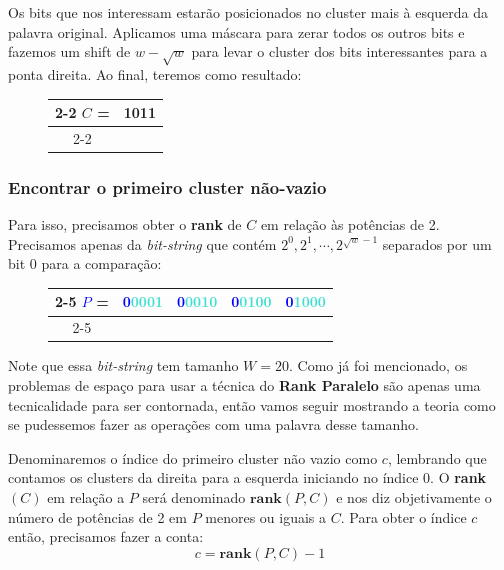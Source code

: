 Os bits que nos interessam estarão posicionados no cluster mais à esquerda da
palavra original. Aplicamos uma máscara para zerar todos os outros bits e
fazemos um shift de $w-\sqrt{w}$ para levar o cluster dos bits interessantes
para a ponta direita. Ao final, teremos como resultado:

\begin{figure}[h]
 \bf \Large\centering
 \begin{tabular}{c|c|}
\cline{2-2}
\textcolor{PineGreen}{$C$} = &
\textcolor{PineGreen}{1011} \\
\cline{2-2}
  \end{tabular}
\end{figure}

\subsubsection{Encontrar o primeiro cluster não-vazio}

Para isso, precisamos obter o \textbf{rank} de $C$ em relação às potências de 2.
Precisamos apenas da \textit{bit-string} que contém
${2^0,2^1,\cdots,2^{\sqrt{w}-1}}$ separados por um bit 0 para a comparação:

\begin{figure}[h]
 \bf \Large\centering
 \begin{tabular}{c|cccc|}
\cline{2-5}
\textcolor{Blue}{$P$} = &
\textcolor{Blue}{0}\textcolor{Turquoise}{0001} &
\textcolor{Blue}{0}\textcolor{Turquoise}{0010} &
\textcolor{Blue}{0}\textcolor{Turquoise}{0100} &
\textcolor{Blue}{0}\textcolor{Turquoise}{1000} \\
\cline{2-5}
  \end{tabular}
\end{figure}

Note que essa \textit{bit-string} tem tamanho $W=20$. Como já foi mencionado,
os problemas de espaço para usar a técnica do \textbf{Rank Paralelo} são apenas uma
tecnicalidade para ser contornada, então vamos seguir mostrando a teoria como se
pudessemos fazer as operações com uma palavra desse tamanho.

Denominaremos o índice do primeiro cluster não vazio como $c$, lembrando que
contamos os clusters da direita para a esquerda iniciando no índice 0. O
\textbf{rank}$(C)$ em relação a $P$ será denominado $\textbf{rank}(P,C)$ e nos
diz objetivamente o número de potências de 2 em $P$ menores ou iguais a $C$.
Para obter o índice $c$ então, precisamos fazer a conta:
\[
c=\textbf{rank}(P,C)-1
\]

